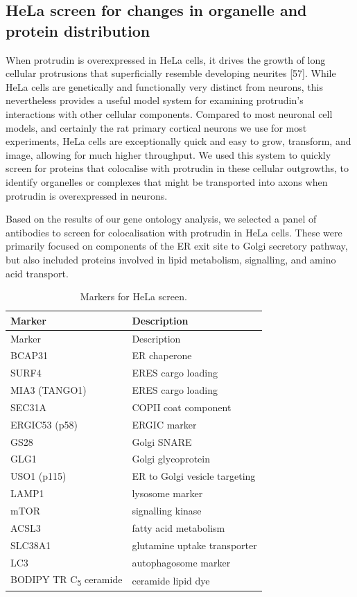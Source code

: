 \documentclass[
  12pt,
  a4paper,
]{book}
\begin{document}
\subsection{HeLa screen for changes in organelle and protein distribution}\label{hela-screen-for-changes-in-organelle-and-protein-distribution}

When protrudin is overexpressed in HeLa cells, it drives the growth of long cellular protrusions that superficially resemble developing neurites {[}57{]}. While HeLa cells are genetically and functionally very distinct from neurons, this nevertheless provides a useful model system for examining protrudin's interactions with other cellular components. Compared to most neuronal cell models, and certainly the rat primary cortical neurons we use for most experiments, HeLa cells are exceptionally quick and easy to grow, transform, and image, allowing for much higher throughput. We used this system to quickly screen for proteins that colocalise with protrudin in these cellular outgrowths, to identify organelles or complexes that might be transported into axons when protrudin is overexpressed in neurons.

Based on the results of our gene ontology analysis, we selected a panel of antibodies to screen for colocalisation with protrudin in HeLa cells. These were primarily focused on components of the ER exit site to Golgi secretory pathway, but also included proteins involved in lipid metabolism, signalling, and amino acid transport.

\begin{longtable}[]{@{}ll@{}}
\caption{\label{tab:unnamed-chunk-1}Markers for HeLa screen.}\tabularnewline
\toprule\noalign{}
Marker & Description \\
\midrule\noalign{}
\endfirsthead
\toprule\noalign{}
Marker & Description \\
\midrule\noalign{}
\endhead
\bottomrule\noalign{}
\endlastfoot
BCAP31 & ER chaperone \\
SURF4 & ERES cargo loading \\
MIA3 (TANGO1) & ERES cargo loading \\
SEC31A & COPII coat component \\
ERGIC53 (p58) & ERGIC marker \\
GS28 & Golgi SNARE \\
GLG1 & Golgi glycoprotein \\
USO1 (p115) & ER to Golgi vesicle targeting \\
LAMP1 & lysosome marker \\
mTOR & signalling kinase \\
ACSL3 & fatty acid metabolism \\
SLC38A1 & glutamine uptake transporter \\
LC3 & autophagosome marker \\
BODIPY TR C\textsubscript{5} ceramide & ceramide lipid dye \\
\end{longtable}
\end{document}
